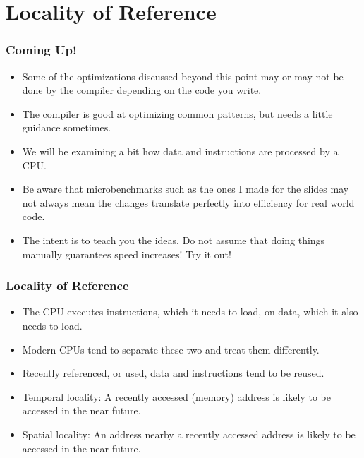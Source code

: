 \documentclass[10pt]{beamer}
\begin{document}
\section*{Locality of Reference}

\begin{frame}[plain]
    \frametitle{Coming Up!}
    \begin{itemize}
        \item<1-> Some of the optimizations discussed beyond this point may or may not be done by the compiler depending on the code you write.
        \item<2-> The compiler is good at optimizing common patterns, but needs a little guidance sometimes.
        \item<3-> We will be examining a bit how data and instructions are processed by a CPU.
        \item<4-> Be aware that microbenchmarks such as the ones I made for the slides may not always mean the changes translate perfectly into efficiency for real world code.
        \item<5-> The intent is to teach you the ideas. Do not assume that doing things manually guarantees speed increases! Try it out!
    \end{itemize}
\end{frame}

\begin{frame}[plain]
    \frametitle{Locality of Reference}
    \begin{itemize}
        \item<1-> The CPU executes instructions, which it needs to load, on data, which it also needs to load.
        \item<2-> Modern CPUs tend to separate these two and treat them differently.
        \item<3-> Recently referenced, or used, data and instructions tend to be reused.
        \item<4-> Temporal locality: A recently accessed (memory) address is likely to be accessed in the near future.
        \item<5-> Spatial locality: An address nearby a recently accessed address is likely to be accessed in the near future.
    \end{itemize}
\end{frame}
\end{document}
